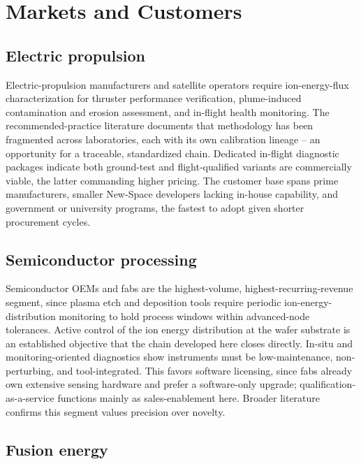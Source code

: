 \section{Markets and Customers}
\label{sec:markets}

\subsection{Electric propulsion}

Electric-propulsion manufacturers and satellite operators require ion-energy-flux characterization for thruster performance verification, plume-induced contamination and erosion assessment, and in-flight health monitoring. The recommended-practice literature \cite{ref0490,ref0511} documents that methodology has been fragmented across laboratories, each with its own calibration lineage -- an opportunity for a traceable, standardized chain. Dedicated in-flight diagnostic packages \cite{ref0496} indicate both ground-test and flight-qualified variants are commercially viable, the latter commanding higher pricing. The customer base spans prime manufacturers, smaller New-Space developers lacking in-house capability, and government or university programs, the fastest to adopt given shorter procurement cycles.

\subsection{Semiconductor processing}

Semiconductor OEMs and fabs are the highest-volume, highest-recurring-revenue segment, since plasma etch and deposition tools require periodic ion-energy-distribution monitoring to hold process windows within advanced-node tolerances. Active control of the ion energy distribution at the wafer substrate \cite{ref0539} is an established objective that the chain developed here closes directly. In-situ \cite{ref0556} and monitoring-oriented \cite{ref0553} diagnostics show instruments must be low-maintenance, non-perturbing, and tool-integrated. This favors software licensing, since fabs already own extensive sensing hardware and prefer a software-only upgrade; qualification-as-a-service functions mainly as sales-enablement here. Broader literature \cite{ref0548} confirms this segment values precision over novelty.

\subsection{Fusion energy}

